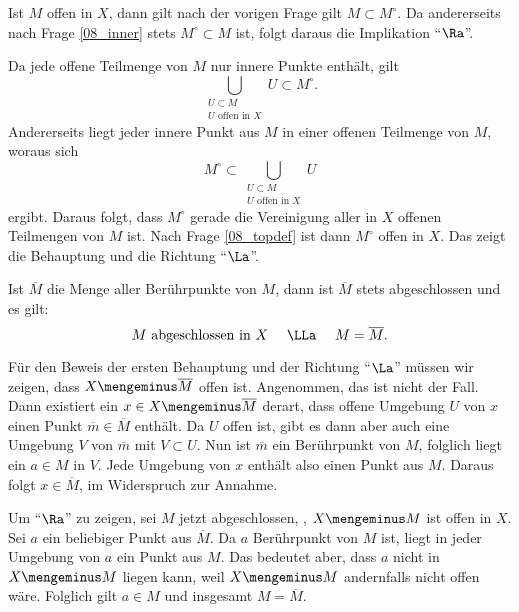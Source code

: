 \begin{antwort}
  Ist $M$ offen in $X$, dann gilt nach der vorigen Frage  
  gilt $M \subset M^\circ$. Da andererseits nach Frage 
  \ref{08_inner} stets $M^\circ \subset M$ ist, folgt  
  daraus die Implikation "`$\Ra$"'.

  Da jede offene Teilmenge von $M$ nur innere Punkte enthält, gilt      
  \[
  \bigcup_{\substack{U\subset M \\ \text{$U$ offen in $X$}}} U 
  \subset M^\circ.
  \] 
  Andererseits liegt jeder innere Punkt aus $M$ in einer offenen Teilmenge 
  von $M$, woraus sich 
  \[
  M^\circ \subset \bigcup_{\substack{U\subset M \\ \text{$U$ offen in $X$}}} U
  \] 
  ergibt. Daraus folgt, dass $M^\circ$ gerade die 
  Vereinigung aller in $X$ offenen Teilmengen von $M$ ist. 
  Nach Frage \ref{08_topdef}  ist dann $M^\circ$  
  offen in $X$. 
  Das zeigt die Behauptung und die Richtung "`$\La$"'.  
  \AntEnd
\end{antwort}

\begin{frage}\label{08_ber}
  Ist $\overline{M}$ die Menge aller Berührpunkte von $M$, dann 
  ist $\overline{M}$ stets abgeschlossen und es gilt:
  \[
  \text{$M$ abgeschlossen in $X$ \quad $\LLa$ \quad $M=\overline{M}$}.
  \]
\end{frage}

\begin{antwort}
  Für den Beweis der ersten Behauptung und der Richtung "`$\La$"' 
  müssen wir zeigen, dass $X\mengeminus \overline{M}$ offen ist. 
  Angenommen, das ist nicht der Fall. 
  Dann existiert ein $x\in X\mengeminus \overline{M}$ derart, dass 
   offene Umgebung $U$ von $x$ einen Punkt 
  $\overline{m} \in \overline{M}$ enthält. 
  Da $U$ offen ist, gibt es dann aber auch eine Umgebung 
  $V$ von $\overline{m}$ mit $V\subset U$. 
  Nun ist $\overline{m}$ ein Berührpunkt von $M$, folglich 
  liegt ein $a \in M$ in $V$. Jede Umgebung von $x$ 
  enthält also einen Punkt aus $M$. 
  Daraus folgt $x\in \overline{M}$, im Widerspruch zur Annahme.

  Um "`$\Ra$"' zu zeigen, sei $M$ jetzt 
  abgeschlossen, {\dasheisst}, $X\mengeminus M$ ist offen in 
  $X$. Sei $a$ ein beliebiger Punkt aus $\overline{M}$. Da $a$ Berührpunkt  
  von $M$ ist, liegt in jeder Umgebung von $a$ ein Punkt aus $M$. 
  Das bedeutet aber, dass $a$ nicht in $X\mengeminus M$ liegen kann, weil 
  $X\mengeminus M$ andernfalls nicht offen wäre. Folglich gilt $a\in M$ 
  und insgesamt $M=\overline{M}$. \AntEnd  
\end{antwort}

